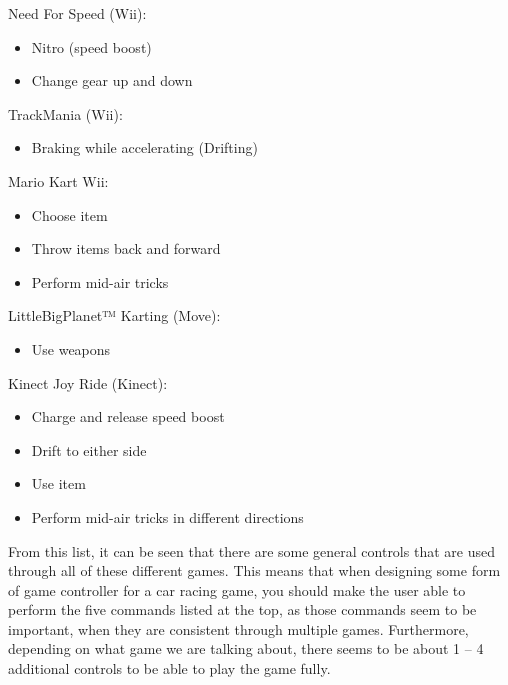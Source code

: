 \noindent Need For Speed (Wii):
\begin{itemize}
\item Nitro (speed boost)
\item Change gear up and down
\end{itemize}

\noindent TrackMania (Wii):
\begin{itemize}
\item Braking while accelerating (Drifting)
\end{itemize}

\noindent Mario Kart Wii:
\begin{itemize}
\item Choose item
\item Throw items back and forward
\item Perform mid-air tricks
\end{itemize}

\noindent LittleBigPlanet™ Karting (Move):
\begin{itemize}
\item Use weapons
\end{itemize}

\noindent Kinect Joy Ride (Kinect):
\begin{itemize}
\item Charge and release speed boost
\item Drift to either side
\item Use item
\item Perform mid-air tricks in different directions
\end{itemize}

From this list, it can be seen that there are some general controls that are used through all of these different games. This means that when designing some form of game controller for a car racing game, you should make the user able to perform the five commands listed at the top, as those commands seem to be important, when they are consistent through multiple games. Furthermore, depending on what game we are talking about, there seems to be about 1 – 4 additional controls to be able to play the game fully.

